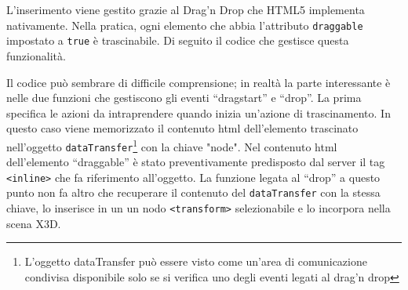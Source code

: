 L'inserimento viene gestito grazie al Drag'n Drop che HTML5 implementa nativamente. Nella pratica, ogni elemento che abbia l'attributo \texttt{draggable} impostato a \texttt{true} è trascinabile. Di seguito il codice che gestisce questa funzionalità.


Il codice può sembrare di difficile comprensione; in realtà la parte interessante è nelle due funzioni che gestiscono gli eventi ``dragstart'' e ``drop''. La prima specifica le azioni da intraprendere quando inizia un'azione di trascinamento. In questo caso viene memorizzato il contenuto html dell'elemento trascinato nell'oggetto \texttt{dataTransfer}\footnote{L'oggetto dataTransfer può essere visto come un'area di comunicazione condivisa disponibile solo se si verifica uno degli eventi legati al drag'n drop} con la chiave "node". Nel contenuto html dell'elemento ``draggable'' è stato preventivamente predisposto dal server il tag \texttt{<inline>} che fa riferimento all'oggetto. La funzione legata al ``drop'' a questo punto non fa altro che recuperare il contenuto del \texttt{dataTransfer} con la stessa chiave, lo inserisce in un un nodo \texttt{<transform>} selezionabile e lo incorpora nella scena X3D.

